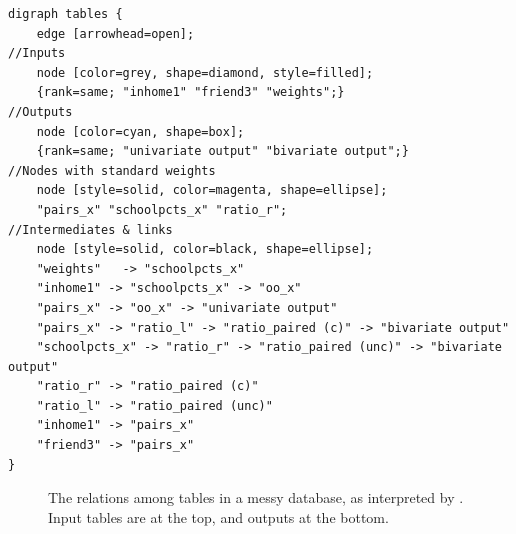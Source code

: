 \begin{lstlisting}
digraph tables {
    edge [arrowhead=open];
//Inputs
    node [color=grey, shape=diamond, style=filled];
    {rank=same; "inhome1" "friend3" "weights";}
//Outputs
    node [color=cyan, shape=box];
    {rank=same; "univariate output" "bivariate output";}
//Nodes with standard weights
    node [style=solid, color=magenta, shape=ellipse];
    "pairs_x" "schoolpcts_x" "ratio_r";
//Intermediates & links
    node [style=solid, color=black, shape=ellipse];
    "weights"   -> "schoolpcts_x" 
    "inhome1" -> "schoolpcts_x" -> "oo_x" 
    "pairs_x" -> "oo_x" -> "univariate output"
    "pairs_x" -> "ratio_l" -> "ratio_paired (c)" -> "bivariate output"
    "schoolpcts_x" -> "ratio_r" -> "ratio_paired (unc)" -> "bivariate output"
    "ratio_r" -> "ratio_paired (c)"
    "ratio_l" -> "ratio_paired (unc)"
    "inhome1" -> "pairs_x" 
    "friend3" -> "pairs_x" 
}
\end{lstlisting}

\begin{figure}
\begin{center}
\caption{The relations among tables in a messy database, as interpreted by
. Input tables are at the top, and outputs at the bottom.}\label{sqlplot}
\end{center}
\end{figure}

